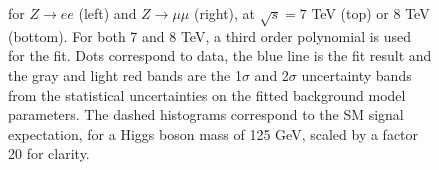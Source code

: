 \begin{figure}[!htbp]
\begin{center}
{      for $Z\to ee$ (left) and $Z\to\mu\mu$ (right), at $\sqrt{s}=7$ 
      TeV (top) or 8 TeV (bottom).
      For both 7 and 8 TeV, a third order polynomial is used for the fit.
      Dots correspond to data, the blue line is the fit result and the gray and light red
      bands are the 1$\sigma$ and 2$\sigma$ uncertainty 
      bands from the statistical uncertainties on the fitted 
      background model parameters.
      The dashed histograms correspond to the SM signal expectation,
      for a Higgs boson mass of 125 GeV, scaled by a factor 20 for clarity.
    }
    \label{fig:deltaM_data_bkgonly_fit}
  \end{center}
\end{figure}
